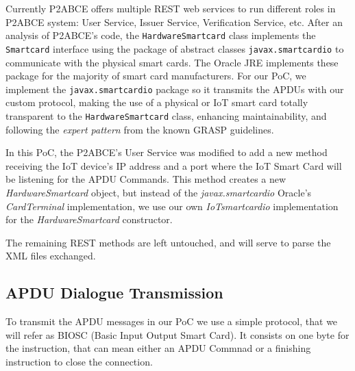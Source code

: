 Currently P2ABCE offers multiple REST web services to run different roles in P2ABCE system: User Service, Issuer Service, Verification Service, etc. 
%
After an analysis of P2ABCE's code, the \texttt{HardwareSmartcard} class implements the \texttt{Smartcard} interface using the package of abstract classes \texttt{javax.smartcardio} to communicate with the physical smart cards. The Oracle JRE implements these package for the majority of smart card manufacturers. For our PoC, we implement the \texttt{javax.smartcardio} package so it transmits the APDUs with our custom protocol, making the use of a physical or IoT smart card totally transparent to the \texttt{HardwareSmartcard} class, enhancing maintainability, and following the \textit{expert pattern} from the known GRASP guidelines.

In this PoC, the P2ABCE's User Service was modified to add a new method receiving the IoT device's  IP address and a port where the IoT Smart Card will be listening for the APDU Commands.
This method creates a new \textit{HardwareSmartcard} object, but instead of the \textit{javax.smartcardio} Oracle's \textit{CardTerminal} implementation, we use our own \textit{IoTsmartcardio} implementation for the \textit{HardwareSmartcard} constructor.


The remaining REST methods are left untouched, and will serve to parse the XML files exchanged.

\hfil

\subsection{APDU Dialogue Transmission}


To transmit the APDU messages in our PoC we use a simple protocol, that we will refer as BIOSC (Basic Input Output Smart Card). It consists on one byte for the instruction, that can mean either an APDU Commnad or a finishing instruction to close the connection.

